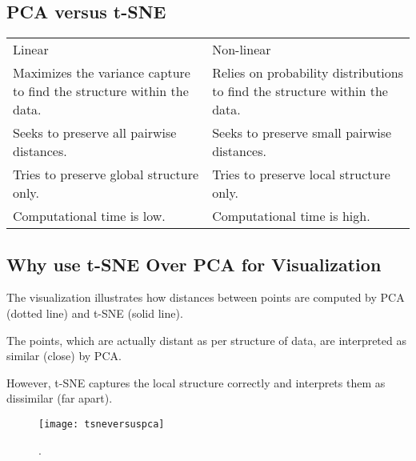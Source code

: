 	\subsection{PCA versus t-SNE}
	\begin{tabular}{|p{}|p{}|} \hline
			\tablecolumnheadervlinesone{PCA} & \tablecolumnheadervlinestwo{t-SNE} \\ \hline
			Linear &
            Non-linear \\ \hline
			Maximizes the variance capture to find the structure within the data. &
			Relies on probability distributions to find the structure within the data.  \\ \hline
			Seeks to preserve all pairwise distances. &
			Seeks to preserve small pairwise distances. \\ \hline
			Tries to preserve global structure only. &
			Tries to preserve local structure only. \\ \hline
			Computational time is low. &
			Computational time is high. \\ \hline%
		\end{tabular}


	\subsection{Why use t-SNE Over PCA for Visualization}
	\begin{bulletedlist}
		\item The visualization illustrates how distances between points are computed by PCA (dotted line) and t-SNE (solid line).
		\item The points, which are actually distant as per structure of data, are interpreted as similar (close) by PCA.
		\item However, t-SNE captures the local structure correctly and interprets them as dissimilar (far apart).
	\end{bulletedlist}

 	\begin{figure}[h]
		\centering
		\texttt{[image: tsneversuspca]}
		\caption{.}
		\label{fig:tsneversuspca}
	\end{figure}

